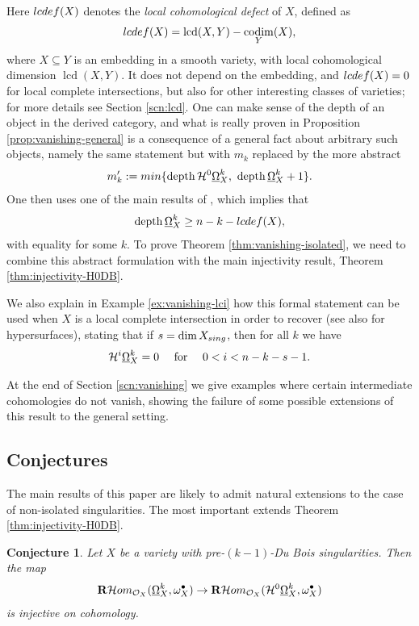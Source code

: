 \documentclass[11pt]{amsart}
\theoremstyle{definition}
\theoremstyle{plain}
\renewcommand{\H}{\mathcal H}
\renewcommand{\O}{\mathcal O}
\newcommand{\RHom}{{\bf R} \H om}
\newcommand{\DB}{\underline{\Omega}} %
\DeclareMathOperator{\lcd}{lcd}
\DeclareMathOperator{\codim}{codim}
\DeclareMathOperator{\depth}{depth}
\newcounter{intro}
\newtheorem{intro-conjecture}[intro]{Conjecture}
\begin{document}
Here ${\rm lcdef} (X)$ denotes the \emph{local cohomological defect} of $X$, defined as 
$${\rm lcdef}(X)= \lcd (X, Y) - \codim_Y (X),$$ 
where $X \subseteq Y$ is an embedding in a smooth variety, with local cohomological dimension $\lcd (X, Y)$. It does not depend on the embedding, and ${\rm lcdef}(X)= 0$ for local complete intersections, but also for other interesting classes of varieties; for more details see Section \ref{scn:lcd}.  One can make sense of the depth of an object in the derived category, and what is really proven in Proposition \ref{prop:vanishing-general} is a consequence of a general fact about arbitrary such objects, namely the same statement but with $m_k$ replaced by the more abstract
$$m_k^\prime := {\rm min} \{\depth\H^0\DB^k_X, ~  \depth \DB^k_X + 1\}.$$
One then uses  one of the main results of \cite{MP-LC}, which implies that 
$$\depth \DB^k_X \ge n - k - {\rm lcdef} (X),$$
with equality for some $k$. 
To prove Theorem \ref{thm:vanishing-isolated}, we need to combine this abstract formulation with the main injectivity result, Theorem \ref{thm:injectivity-H0DB}.

We also explain in Example \ref{ex:vanishing-lci} how this formal statement can be used when $X$ is a local complete intersection in order to recover 
 \cite[Corollary 13.9]{MP-LC} (see also \cite{MOPW} for hypersurfaces), stating that if $s = \dim X_{{\rm sing}}$, then for all $k$ we have
\[\H^i\DB^k_X = 0 \quad \text{ {\rm for} } \quad 0<i< n - k - s -1.\]

At the end of Section \ref{scn:vanishing} we give examples where certain intermediate cohomologies do not vanish, showing the failure of some possible extensions of this result to the general setting. 


\subsection*{Conjectures}
The main results of this paper are likely to admit natural extensions to the case of non-isolated singularities. The most important 
extends Theorem \ref{thm:injectivity-H0DB}.

\begin{intro-conjecture}\label{conj:injectivity-H0DB}
    Let $X$ be a variety with pre-$(k-1)$-Du Bois singularities. Then the map
    \[\RHom_{\O_X}(\DB_X^k,\omega_X^{\bullet})\to \RHom_{\O_X}(\H^0\DB_X^k,\omega_X^{\bullet})\]
    is injective on cohomology. 
\end{intro-conjecture}
\end{document}
